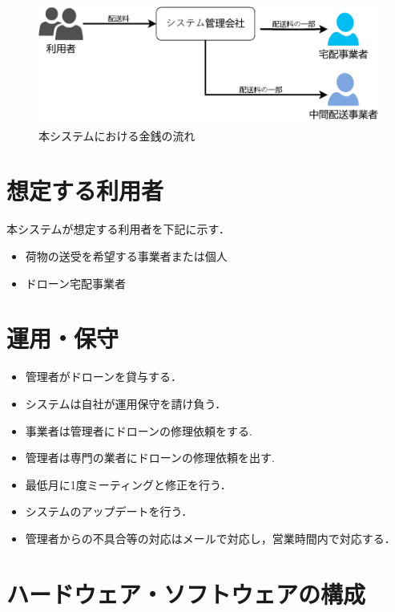 \documentclass[a4paper, titlepage]{jsarticle}
\begin{document}
\begin{figure}[H]
  \centering
  \includegraphics[width=0.8\linewidth]{./money_flow.pdf}
  \caption{本システムにおける金銭の流れ}
  \label{fig:money_flow}
\end{figure}


\section{想定する利用者}
本システムが想定する利用者を下記に示す．
\begin{itemize}
  \item 荷物の送受を希望する事業者または個人
  \item ドローン宅配事業者
\end{itemize}

\section{運用・保守}
\begin{itemize}
  \item 管理者がドローンを貸与する．
  \item システムは自社が運用保守を請け負う．
  \item 事業者は管理者にドローンの修理依頼をする.
  \item 管理者は専門の業者にドローンの修理依頼を出す.
  \item 最低月に1度ミーティングと修正を行う．
  \item システムのアップデートを行う．
  \item 管理者からの不具合等の対応はメールで対応し，営業時間内で対応する．
\end{itemize}

\section{ハードウェア・ソフトウェアの構成}
\end{document}
